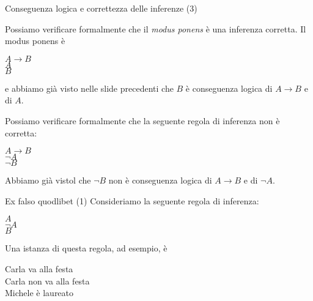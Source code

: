 \documentclass[aspectratio=169,10pt,dvipsnames,xcolor=table,handout]{beamer}
\begin{document}
\begin{frame}{Conseguenza logica e correttezza delle inferenze (3)}
    \begin{example}
        Possiamo verificare formalmente che il \emph{modus ponens} è una inferenza corretta. Il modus ponens è
        \begin{center}
            \begin{inference}
                $A \to B$\\
                $A$\\
                \hline
                $B$
            \end{inference}
        \end{center}
        e abbiamo già visto nelle slide precedenti che $B$ è conseguenza logica di $A \to B$ e di $A$.
    \end{example}

    \pause
    \begin{example}
        Possiamo verificare formalmente che la seguente regola di inferenza non è corretta:
        \begin{center}
            \begin{inference}
                $A \to B$\\
                $\neg A$\\
                \hline
                $\neg B$
            \end{inference}
        \end{center}
        Abbiamo già vistol che $\neg B$ non è conseguenza logica di $A \to B$ e di $\neg A$.
    \end{example}
\end{frame}

\begin{frame}{Ex falso quodlibet (1)}
    Consideriamo la seguente regola di inferenza:
    \begin{center}
        \begin{inference}
            $A$\\
            $\neg A$\\
            \hline
            $B$
        \end{inference}
    \end{center}

    \pause
    \medskip
    Una istanza di questa regola, ad esempio, è
    \begin{center}
        \begin{inference}
            Carla va alla festa\\
            Carla non va alla festa\\
            \hline
            Michele è laureato
        \end{inference}
    \end{center}
\end{frame}
\end{document}
